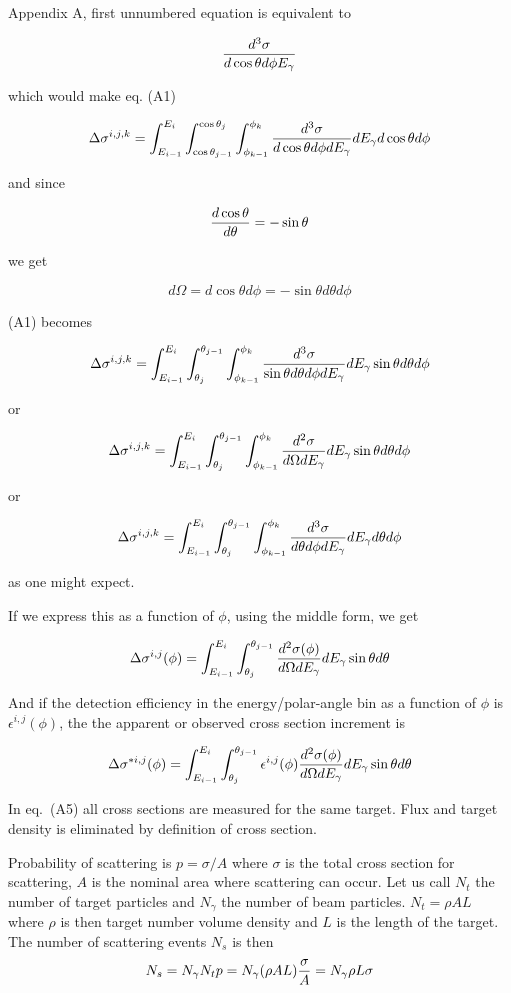 \documentclass{article}
\begin{document}
Appendix A, first unnumbered equation is equivalent to 

$${d^3\sigma \over d\cos\theta d\phi E_\gamma}$$

which would make eq. (A1)

$$\Delta\sigma^{i,j,k} = \int^{E_i}_{E_{i-1}}\int^{\cos\theta_j}_{\cos\theta_{j-1}}\int^{\phi_k}_{\phi_{k-1}} {d^3\sigma \over d\cos\theta d\phi dE_\gamma}dE_\gamma d\cos\theta d\phi$$

and since

$${d\cos\theta \over d\theta} = -\sin\theta$$

we get

$$ d\Omega = d\cos\theta d\phi = -\sin\theta d\theta d\phi $$

(A1) becomes

$$\Delta\sigma^{i,j,k} = \int^{E_i}_{E_{i-1}}\int_{\theta_j}^{\theta_{j-1}}\int^{\phi_k}_{\phi_{k-1}} {d^3\sigma \over \sin\theta d\theta d\phi dE_\gamma} dE_\gamma \sin\theta d\theta d\phi$$

or

$$\Delta\sigma^{i,j,k} = \int^{E_i}_{E_{i-1}}\int_{\theta_j}^{\theta_{j-1}}\int^{\phi_k}_{\phi_{k-1}} {d^2\sigma \over d\Omega dE_\gamma} dE_\gamma \sin\theta d\theta d\phi$$

or

$$\Delta\sigma^{i,j,k} = \int^{E_i}_{E_{i-1}}\int_{\theta_j}^{\theta_{j-1}}\int^{\phi_k}_{\phi_{k-1}} {d^3\sigma \over d\theta d\phi dE_\gamma} dE_\gamma d\theta d\phi$$

as one might expect.

If we express this as a function of $\phi$, using the middle form, we get

$$\Delta\sigma^{i,j}(\phi) = \int^{E_i}_{E_{i-1}}\int_{\theta_j}^{\theta_{j-1}} {d^2\sigma(\phi) \over d\Omega dE_\gamma} dE_\gamma \sin\theta d\theta$$

And if the detection efficiency in the energy/polar-angle bin as a function of $\phi$ is $\epsilon^{i,j}(\phi)$, the the apparent or observed cross section increment is

$$\Delta\sigma^{*i,j}(\phi) = \int^{E_i}_{E_{i-1}}\int_{\theta_j}^{\theta_{j-1}} \epsilon^{i,j}(\phi){d^2\sigma(\phi) \over d\Omega dE_\gamma} dE_\gamma \sin\theta d\theta$$

In eq.~(A5) all cross sections are measured for the same target. Flux and target density is eliminated by definition of cross section.

Probability of scattering is $p = \sigma/A$ where $\sigma$ is the total cross section for scattering, $A$ is the nominal area where scattering can occur. Let us call $N_t$ the number of target particles and $N_\gamma$ the number of beam particles. $N_t = \rho AL$ where $\rho$ is then target number volume density and $L$ is the length of the target. The number of scattering events $N_s$ is then
$$
N_s = N_\gamma N_t p = N_\gamma(\rho A L){\sigma\over A} = N_\gamma\rho L\sigma
$$
\end{document}
